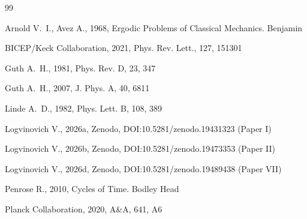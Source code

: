 \documentclass[12pt,a4paper]{article}
\begin{document}
\begin{thebibliography}{99}

Arnold V.~I., Avez A., 1968, Ergodic Problems of Classical Mechanics. Benjamin

BICEP/Keck Collaboration, 2021, Phys. Rev. Lett., 127, 151301

Guth A.~H., 1981, Phys. Rev. D, 23, 347

Guth A.~H., 2007, J. Phys. A, 40, 6811

Linde A.~D., 1982, Phys. Lett. B, 108, 389

Logvinovich V., 2026a, Zenodo, DOI:10.5281/zenodo.19431323 (Paper I)

Logvinovich V., 2026b, Zenodo, DOI:10.5281/zenodo.19473353 (Paper II)

Logvinovich V., 2026d, Zenodo, DOI:10.5281/zenodo.19489438 (Paper VII)

Penrose R., 2010, Cycles of Time. Bodley Head

Planck Collaboration, 2020, A\&A, 641, A6

\end{thebibliography}
\end{document}
